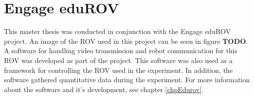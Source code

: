 \section{Engage eduROV}

This master thesis was conducted in conjunction with the Engage eduROV project. An image of the ROV used in this project can be seen in figure \textbf{TODO}. A software for handling video transmission and robot communication for this ROV was developed as part of the project. This software was also used as a framework for controlling the ROV used in the experiment. In addition, the software gathered quantitative data during the experiment. For more information about the software and it's development, see chapter \ref{chpEdurov}.

